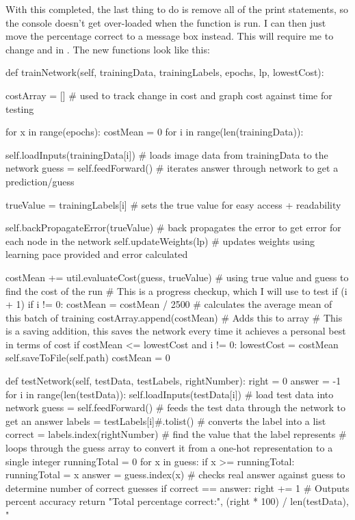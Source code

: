 \documentclass{report}
\begin{document}
\newline 
With this completed, the last thing to do is remove all of the print statements, so the console doesn't get over-loaded when the function is run. I can then just move the percentage correct to a message box instead. This will require me to change  and  in . The new functions look like this:
\begin{python}
def trainNetwork(self, trainingData, trainingLabels, epochs, lp, lowestCost):

    costArray = []  # used to track change in cost and graph cost against time for testing

    for x in range(epochs):
        costMean = 0
        for i in range(len(trainingData)):

            self.loadInputs(trainingData[i])  # loads image data from trainingData to the network
            guess = self.feedForward()  # iterates answer through network to get a prediction/guess

            trueValue = trainingLabels[i]  # sets the true value for easy access + readability

            self.backPropagateError(trueValue)  # back propagates the error to get error for each node in the network
            self.updateWeights(lp)  # updates weights using learning pace provided and error calculated

            costMean += util.evaluateCost(guess, trueValue)  # using true value and guess to find the cost of the run
            # This is a progress checkup, which I will use to test
            if (i + 1) %
                if i != 0:
                    costMean = costMean / 2500  # calculates the average mean of this batch of training
                costArray.append(costMean)  # Adds this to array
                # This is a saving addition, this saves the network every time it achieves a personal best in terms of cost
                if costMean <= lowestCost and i != 0:
                    lowestCost = costMean
                    self.saveToFile(self.path)
                costMean = 0

def testNetwork(self, testData, testLabels, rightNumber):
    right = 0
    answer = -1
    for i in range(len(testData)):
        self.loadInputs(testData[i])  # load test data into network
        guess = self.feedForward()  # feeds the test data through the network to get an answer
        labels = testLabels[i]#.tolist()  # converts the label into a list
        correct = labels.index(rightNumber)  # find the value that the label represents
        # loops through the guess array to convert it from a one-hot representation to a single integer
        runningTotal = 0
        for x in guess:
            if x >= runningTotal:
                runningTotal = x
                answer = guess.index(x)
        # checks real answer against guess to determine number of correct guesses
        if correct == answer:
            right += 1
    # Outputs percent accuracy
    return "Total percentage correct:", (right * 100) / len(testData), "%
\end{python}
\end{document}
